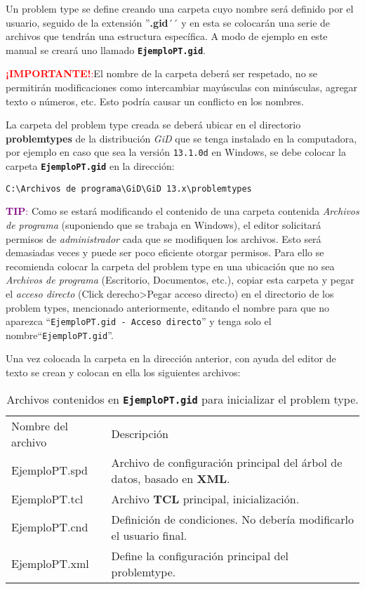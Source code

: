 \documentclass[10pt, a4paper, twocolumn]{article} %
\begin{document}
Un problem type se define creando una carpeta cuyo nombre será definido por el usuario, seguido de la extensión ''\textbf{.gid}´´ y en esta se colocarán una serie de archivos que tendrán una estructura específica. A modo de ejemplo en este manual se creará uno llamado \textbf{\texttt{EjemploPT.gid}}.

\textcolor{red}{\textbf{¡IMPORTANTE!}:}El nombre de la carpeta deberá ser respetado, no se permitirán modificaciones como intercambiar mayúsculas con minúsculas, agregar texto o números, etc. Esto podría causar un conflicto en los nombres.

La carpeta del problem type creada se deberá ubicar en el directorio \textbf{problemtypes} de la distribución \textit{GiD} que se tenga instalado en la computadora, por ejemplo en caso que sea la versión \texttt{13.1.0d} en Windows, se debe colocar la carpeta \textbf{\texttt{EjemploPT.gid}} en la dirección:

\begin{small}
\begin{verbatim}
C:\Archivos de programa\GiD\GiD 13.x\problemtypes
\end{verbatim}
\end{small}

\textcolor{purple}{\textbf{TIP}:} Como se estará modificando el contenido de una carpeta contenida \textit{Archivos de programa} (suponiendo que se trabaja en Windows), el editor solicitará permisos de \textit{administrador} cada que se modifiquen los archivos. Esto será demasiadas veces y puede ser poco eficiente otorgar permisos. Para ello se recomienda colocar la carpeta del problem type en una ubicación que no sea \textit{Archivos de programa} (Escritorio, Documentos, etc.), copiar esta carpeta y pegar el \textit{acceso directo} (Click derecho>Pegar acceso directo) en el directorio de los problem types, mencionado anteriormente, editando el nombre para que no aparezca ``\texttt{EjemploPT.gid - Acceso directo}'' y tenga solo el nombre``\texttt{EjemploPT.gid}''.

Una vez colocada la carpeta en la dirección anterior, con ayuda del editor de texto se crean y colocan en ella los siguientes archivos:

\begin{table}[hbtp!]
	\begin{tabular}{l m{4.5cm}}
		\rowcolor{BlueGiD!60} Nombre del archivo & Descripción\\
		\rowcolor{BlueGiD!20} EjemploPT.spd & Archivo de configuración principal del árbol de datos, basado en \textbf{XML}.\\
		EjemploPT.tcl & Archivo \textbf{TCL} principal, inicialización.\\
		\rowcolor{BlueGiD!20} EjemploPT.cnd & Definición de condiciones. No debería modificarlo el usuario final.\\
		EjemploPT.xml & Define la configuración principal del problemtype.\\
	\end{tabular}
	\caption{Archivos contenidos en \textbf{\texttt{EjemploPT.gid}} para inicializar el problem type.\label{tab:estructuraArchivos}}
\end{table}
\end{document}
